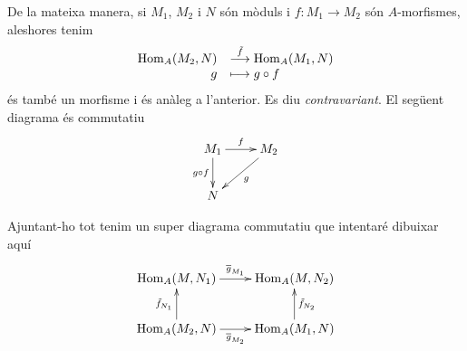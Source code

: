 \documentclass[../../../main.tex]{subfiles}
\begin{document}
De la mateixa manera, si $M_1$, $M_2$ i $N$ són mòduls i $f:M_1\to M_2$ són $A$-morfismes, aleshores tenim
\begin{equation}
    \notag
    \begin{array}{rl}
        \mathrm{Hom}_A(M_2,N) & \overset{\Tilde{f}}{\longrightarrow} \mathrm{Hom}_A(M_1,N) \\
        g & \longmapsto g\circ f
    \end{array}
\end{equation}
és també un morfisme i és anàleg a l'anterior. Es diu \textit{contravariant}. El següent diagrama és commutatiu
\begin{equation}
    \notag
    \xymatrix{
    M_1\ar[r]^f\ar[d]_{g\circ f} & M_2\ar[dl]^g\\
    N
    }
\end{equation}

Ajuntant-ho tot tenim un super diagrama commutatiu que intentaré dibuixar aquí
\begin{equation}
    \notag
    \xymatrix{
    \mathrm{Hom}_A(M,N_1)\ar[r]^{\overline{g}_{M_1}} & \mathrm{Hom}_A(M,N_2)\\
    \mathrm{Hom}_A(M_2,N)\ar[u]^{\Tilde{f}_{N_1}}\ar[r]_{\overline{g}_{M_2}} & \mathrm{Hom}_A(M_1,N)\ar[u]_{\Tilde{f}_{N_2}}
    }
\end{equation}
\end{document}
